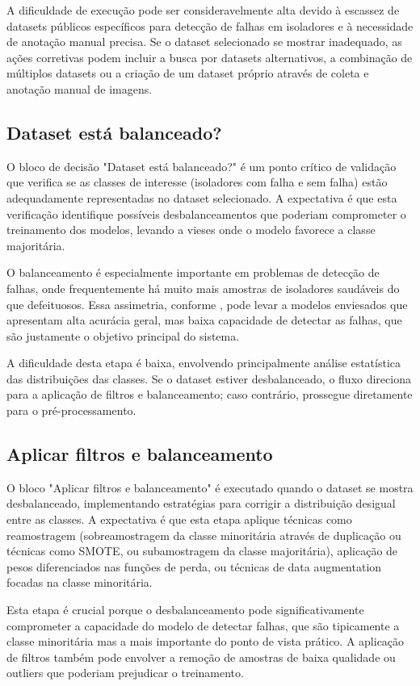 A dificuldade de execução pode ser consideravelmente alta devido à escassez de datasets públicos específicos para detecção de falhas em isoladores e à necessidade de anotação manual precisa. Se o dataset selecionado se mostrar inadequado, as ações corretivas podem incluir a busca por datasets alternativos, a combinação de múltiplos datasets ou a criação de um dataset próprio através de coleta e anotação manual de imagens.

\subsection{Dataset está balanceado?}
O bloco de decisão "Dataset está balanceado?" é um ponto crítico de validação que verifica se as classes de interesse (isoladores com falha e sem falha) estão adequadamente representadas no dataset selecionado. A expectativa é que esta verificação identifique possíveis desbalanceamentos que poderiam comprometer o treinamento dos modelos, levando a vieses onde o modelo favorece a classe majoritária.

O balanceamento é especialmente importante em problemas de detecção de falhas, onde frequentemente há muito mais amostras de isoladores saudáveis do que defeituosos. Essa assimetria, conforme , pode levar a modelos enviesados que apresentam alta acurácia geral, mas baixa capacidade de detectar as falhas, que são justamente o objetivo principal do sistema.

A dificuldade desta etapa é baixa, envolvendo principalmente análise estatística das distribuições das classes. Se o dataset estiver desbalanceado, o fluxo direciona para a aplicação de filtros e balanceamento; caso contrário, prossegue diretamente para o pré-processamento.

\subsection{Aplicar filtros e balanceamento}
O bloco "Aplicar filtros e balanceamento" é executado quando o dataset se mostra desbalanceado, implementando estratégias para corrigir a distribuição desigual entre as classes. A expectativa é que esta etapa aplique técnicas como reamostragem (sobreamostragem da classe minoritária através de duplicação ou técnicas como SMOTE, ou subamostragem da classe majoritária), aplicação de pesos diferenciados nas funções de perda, ou técnicas de data augmentation focadas na classe minoritária.

Esta etapa é crucial porque o desbalanceamento pode significativamente comprometer a capacidade do modelo de detectar falhas, que são tipicamente a classe minoritária mas a mais importante do ponto de vista prático. A aplicação de filtros também pode envolver a remoção de amostras de baixa qualidade ou outliers que poderiam prejudicar o treinamento.

